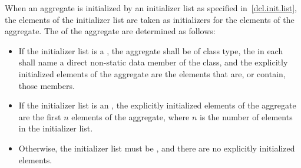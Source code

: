 \pnum
When an aggregate is initialized by an initializer list
as specified in~\ref{dcl.init.list},
the elements of the initializer list are taken as initializers
for the elements of the aggregate.
The 
of the aggregate are determined as follows:
\begin{itemize}
\item
If the initializer list is a ,
the aggregate shall be of class type,
the  in each 
shall name a direct non-static data member of the class, and
the explicitly initialized elements of the aggregate
are the elements that are, or contain, those members.
\item
If the initializer list is an ,
the explicitly initialized elements of the aggregate
are the first $n$ elements of the aggregate,
where $n$ is the number of elements in the initializer list.
\item
Otherwise, the initializer list must be \tcode{\{\}},
and there are no explicitly initialized elements.
\end{itemize}


